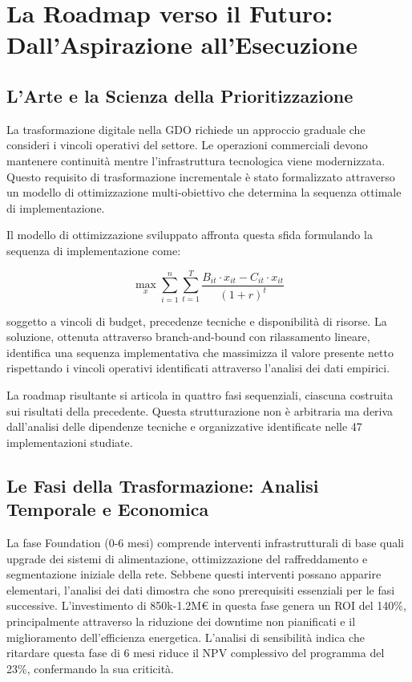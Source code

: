 \section{La Roadmap verso il Futuro: Dall'Aspirazione all'Esecuzione}

\subsection{L'Arte e la Scienza della Prioritizzazione}

La trasformazione digitale nella GDO richiede un approccio graduale che consideri i vincoli operativi del settore. Le operazioni commerciali devono mantenere continuità mentre l'infrastruttura tecnologica viene modernizzata. Questo requisito di trasformazione incrementale è stato formalizzato attraverso un modello di ottimizzazione multi-obiettivo che determina la sequenza ottimale di implementazione.

Il modello di ottimizzazione sviluppato affronta questa sfida formulando la sequenza di implementazione come:

\begin{equation}
\max_{x} \sum_{i=1}^{n} \sum_{t=1}^{T} \frac{B_{it} \cdot x_{it} - C_{it} \cdot x_{it}}{(1+r)^t}
\label{eq:optimization}
\end{equation}

soggetto a vincoli di budget, precedenze tecniche e disponibilità di risorse. La soluzione, ottenuta attraverso branch-and-bound con rilassamento lineare, identifica una sequenza implementativa che massimizza il valore presente netto rispettando i vincoli operativi identificati attraverso l'analisi dei dati empirici.

La roadmap risultante si articola in quattro fasi sequenziali, ciascuna costruita sui risultati della precedente. Questa strutturazione non è arbitraria ma deriva dall'analisi delle dipendenze tecniche e organizzative identificate nelle 47 implementazioni studiate.

\subsection{Le Fasi della Trasformazione: Analisi Temporale e Economica}

La fase Foundation (0-6 mesi) comprende interventi infrastrutturali di base quali upgrade dei sistemi di alimentazione, ottimizzazione del raffreddamento e segmentazione iniziale della rete. Sebbene questi interventi possano apparire elementari, l'analisi dei dati dimostra che sono prerequisiti essenziali per le fasi successive. L'investimento di 850k-1.2M€ in questa fase genera un ROI del 140\%, principalmente attraverso la riduzione dei downtime non pianificati e il miglioramento dell'efficienza energetica. L'analisi di sensibilità indica che ritardare questa fase di 6 mesi riduce il NPV complessivo del programma del 23\%, confermando la sua criticità.

